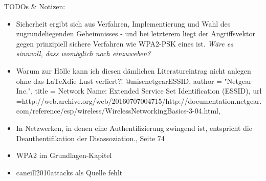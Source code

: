 TODOs \& Notizen:
\begin{itemize}
	\item Sicherheit ergibt sich aus Verfahren, Implementierung und Wahl des zugrundeliegenden Geheimnisses - und bei letzterem liegt der Angriffsvektor gegen prinzipiell sichere Verfahren wie WPA2-PSK eines ist. \textit{Wäre es sinnvoll, dass womöglich noch einzuweben?}
	\item Warum zur Hölle kann ich diesen dämlichen Literatureintrag nicht anlegen ohne das \LaTeX die Lust verliert?! @misc{netgearESSID,
		author = "Netgear Inc.",
		title = {Network Name: Extended Service Set Identification (ESSID)},
		url ={http://web.archive.org/web/20160707004715/http://documentation.netgear.com/reference/esp/wireless/WirelessNetworkingBasics-3-04.html},
	}
	\item In Netzwerken, in denen eine Authentifizierung zwingend ist, entspricht die Deauthentifikation der Disassoziation., Seite 74
	\item WPA2 im Grundlagen-Kapitel
	\item caneill2010attacks als Quelle fehlt
\end{itemize}
